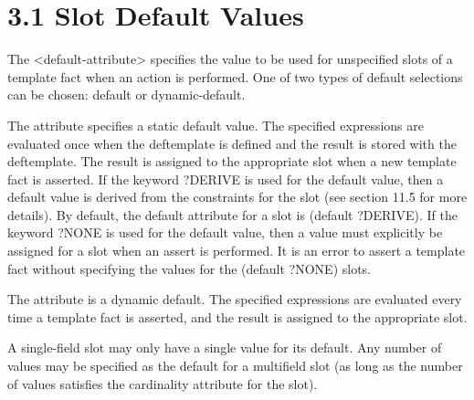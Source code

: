 \documentclass[letterpaper,10pt,english]{sphinxmanual}
\begin{document}

\begin{sphinxVerbatim}[commandchars=\\\{\}]
 
   
   
   
   
   
\end{sphinxVerbatim}


\section{3.1 Slot Default Values}
\label{\detokenize{deftemplate:slot-default-values}}
The \textless{}default-attribute\textgreater{} specifies the value to be used for unspecified
slots of a template fact when an  action is performed. One of
two types of default selections can be chosen: default or
dynamic-default.

The  attribute specifies a static default value. The
specified expressions are evaluated once when the deftemplate is defined
and the result is stored with the deftemplate. The result is assigned to
the appropriate slot when a new template fact is asserted. If the
keyword ?DERIVE is used for the default value, then a default value is
derived from the constraints for the slot (see section 11.5 for more
details). By default, the default attribute for a slot is (default
?DERIVE). If the keyword ?NONE is used for the default value, then a
value must explicitly be assigned for a slot when an assert is
performed. It is an error to assert a template fact without specifying
the values for the (default ?NONE) slots.

The  attribute is a dynamic default. The specified
expressions are evaluated every time a template fact is asserted, and
the result is assigned to the appropriate slot.

A single-field slot may only have a single value for its default. Any
number of values may be specified as the default for a multifield slot
(as long as the number of values satisfies the cardinality attribute for
the slot).

\end{document}

